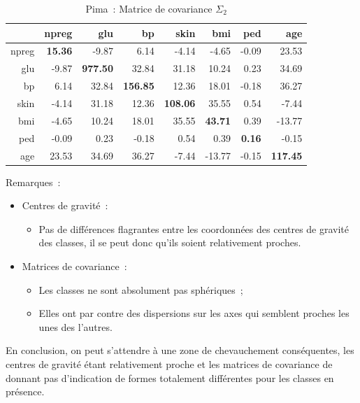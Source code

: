 \documentclass[a4paper,10pt]{report}
\begin{document}
\begin{table}[H]
	\centering
	\begin{tabular}{r|rrrrrrr}
		& npreg & glu & bp & skin & bmi & ped & age \\ 
		\hline
		npreg & \textbf{15.36} & -9.87 & 6.14 & -4.14 & -4.65 & -0.09 & 23.53 \\ 
		glu & -9.87 & \textbf{977.50} & 32.84 & 31.18 & 10.24 & 0.23 & 34.69 \\ 
		bp & 6.14 & 32.84 & \textbf{156.85} & 12.36 & 18.01 & -0.18 & 36.27 \\ 
		skin & -4.14 & 31.18 & 12.36 & \textbf{108.06} & 35.55 & 0.54 & -7.44 \\ 
		bmi & -4.65 & 10.24 & 18.01 & 35.55 & \textbf{43.71} & 0.39 & -13.77 \\ 
		ped & -0.09 & 0.23 & -0.18 & 0.54 & 0.39 & \textbf{0.16} & -0.15 \\ 
		age & 23.53 & 34.69 & 36.27 & -7.44 & -13.77 & -0.15 & \textbf{117.45} \\ 
	\end{tabular}
	\caption{Pima~: Matrice de covariance $\Sigma_{2}$}
\end{table}



Remarques~:
\begin{itemize}
	\item Centres de gravité~:
	\begin{itemize}
		\item Pas de différences flagrantes entre les coordonnées des centres de gravité des classes, il se peut donc qu'ils soient relativement proches.
	\end{itemize}
	\item Matrices de covariance~:
	\begin{itemize}
		\item Les classes ne sont absolument pas sphériques~;
		\item Elles ont par contre des dispersions sur les axes qui semblent proches les unes des l'autres.
	\end{itemize}
\end{itemize}

En conclusion, on peut s'attendre à une zone de chevauchement conséquentes, les centres de gravité étant relativement proche et les matrices de covariance de donnant pas d'indication de formes totalement différentes pour les classes en présence.
\end{document}
